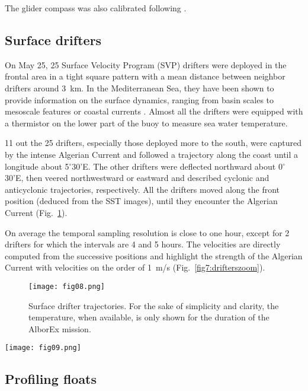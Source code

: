 \documentclass[essd,manuscript]{copernicus}
\begin{document}
The glider compass was also calibrated following \cite{MERCKELBACH2008}.


\subsection{Surface drifters}

On May 25, 25 Surface Velocity Program (SVP) drifters were deployed in the frontal area in a tight square pattern with a mean distance between neighbor drifters around 3~km. In the Mediterranean Sea, they have been shown to provide information on the surface dynamics, ranging from basin scales to mesoscale features or coastal currents \citep{POULAIN13}. Almost all the drifters were equipped with a thermistor on the lower part of the buoy to measure sea water temperature. 

11 out the 25 drifters, especially those deployed more to the south, were captured by the intense Algerian Current and followed a trajectory along the coast until a longitude about 5$^{\circ}$30'E. The other drifters were deflected northward about 0$^{\circ}$30'E, then veered northwestward or eastward 
and described cyclonic and anticyclonic trajectories, respectively. All the drifters moved along the front position (deduced from the SST images), until they encounter the Algerian Current (Fig.~\ref{fig3:drifters}). 

On average the temporal sampling resolution is close to one hour, except for 2 drifters for which the intervals are 4 and 5 hours. The velocities are directly computed from the successive positions and highlight the strength of the Algerian Current with velocities on the order of 1~m/s (Fig.~\ref{fig7:drifterszoom}).    

\begin{figure}[ht]
\texttt{[image: fig08.png]}
\caption{Surface drifter trajectories. For the sake of simplicity and clarity, the temperature, when available, is only shown for the duration of the AlborEx mission.\label{fig3:drifters}}
\end{figure}

\begin{figure*}[ht]
\texttt{[image: fig09.png]}
\caption{Drifter temperature (left-hand side) and velocity in the area of study.\label{fig7:drifterszoom}}
\end{figure*}


\subsection{Profiling floats}
\end{document}

